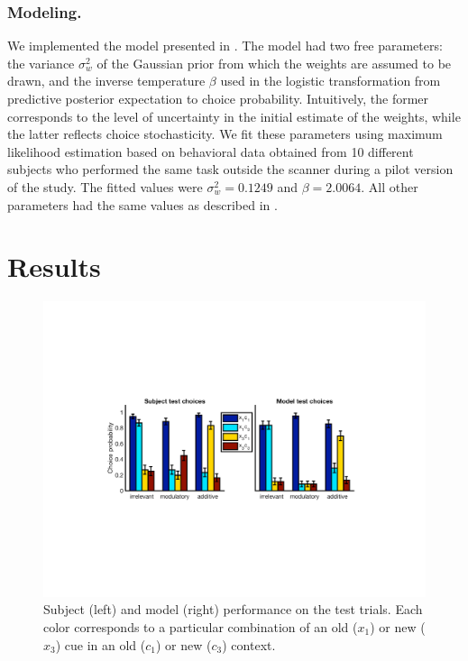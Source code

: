 \documentclass[10pt,letterpaper]{article}
\begin{document}
\subsubsection{Modeling.} 

We implemented the model presented in . The model had two free parameters: the variance $\sigma^2_w$ of the Gaussian prior from which the weights are assumed to be drawn, and the inverse temperature $\beta$ used in the logistic transformation from predictive posterior expectation to choice probability. Intuitively, the former corresponds to the level of uncertainty in the initial estimate of the weights, while the latter reflects choice stochasticity. We fit these parameters using maximum likelihood  estimation based on behavioral data obtained from 10 different subjects who performed the same task outside the scanner during a pilot version of the study. The fitted values were $\sigma^2_w = 0.1249$ and $\beta = 2.0064$. All other parameters had the same values as described in .

\section{Results}

\begin{figure}[ht]
\begin{center}
\includegraphics[scale=0.45,  trim = 120 220 120 200]{behavioral.pdf}
\end{center}
\caption{Subject (left) and model (right) performance on the test trials. Each color corresponds to a particular combination of an old ($x_1$) or new ($x_3$) cue in an old ($c_1$) or new ($c_3$) context.} 
\label{behavioral}
\end{figure}
\end{document}
